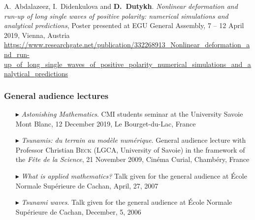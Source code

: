 \begin{etaremune}
  \item A.~Abdalazeez, I.~Didenkulova and \textbf{D.~Dutykh}. \textit{Nonlinear deformation and run-up of long single waves of positive polarity: numerical simulations and analytical predictions}, Poster presented at EGU General Assembly, 7 -- 12 April 2019, Vienna, Austria \\
  \url{https://www.researchgate.net/publication/332268913_Nonlinear_deformation_and_run-up_of_long_single_waves_of_positive_polarity_numerical_simulations_and_analytical_predictions}

\end{etaremune}

\separator
\subsubsection{General audience lectures}

\begin{itemize}

  \item[$\blacktriangleright$] \textit{Astonishing Mathematics}. CMI students seminar at the University Savoie Mont Blanc, 12 December 2019, Le Bourget-du-Lac, France

  \item[$\blacktriangleright$] \textit{Tsunamis: du terrain au mod\`ele num\'erique}. General audience lecture with Professor Christian \textsc{Beck} (LGCA, University of Savoie) in the framework of the \textit{F\^ete de la Science}, 21 November 2009, Cin\'ema Curial, Chamb\'ery, France

  \item[$\blacktriangleright$] \textit{What is applied mathematics?} Talk given for the general audience at \'Ecole Normale Sup\'erieure de Cachan, April, 27, 2007
  
  \item[$\blacktriangleright$] \textit{Tsunami waves}. Talk given for the general audience at \'Ecole Normale Sup\'erieure de Cachan, December, 5, 2006
  
\end{itemize}